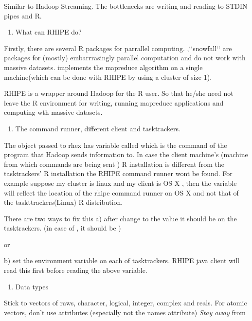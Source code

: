 \documentclass[letterpaper,10pt,english]{manual}
\begin{document}
Similar to Hadoop Streaming. The bottlenecks are writing and reading to STDIN
pipes and R.
\begin{enumerate}
\item {} 
What can RHIPE do?

\end{enumerate}

Firstly, there are several R packages for parrallel computing. ,{}`{}`snowfall{}`{}`
are packages for (mostly) embarrrasingly parallel computation and do not work
with massive datasets.  implements the mapreduce algorithm on a
single machine(which can be done with RHIPE by using a cluster of size 1).

RHIPE is a wrapper around Hadoop for the R user. So that he/she need not leave
the R environment for writing, running mapreduce applications and computing wth
massive datasets.
\begin{enumerate}
\item {} 
The command runner, different client and tasktrackers.

\end{enumerate}

The object passed to rhex has variable called  which is the
command of the program that Hadoop sends information to. In case the client
machine's (machine from which commands are being sent ) R installation is different from the
tasktrackers' R installation the RHIPE command runner wont be found. For example
suppose my cluster is linux and my client is OS X , then the 
variable will reflect the location of the rhipe command runner on OS X and not
that of the taskttrackers(Linux) R distribution.

There are two ways to fix this
a) after  change  to the
value it should be on the tasktrackers.
(in case of , it should be )

or

b) set the environment variable  on each of tasktrackers. RHIPE
java client will read this first before reading the above variable.
\begin{enumerate}
\item {} 
Data types

\end{enumerate}

Stick to vectors of raws, character, logical, integer, complex and reals.
For atomic vectors, don't use attributes (especially not the names attribute)
\emph{Stay away} from 
\end{document}

